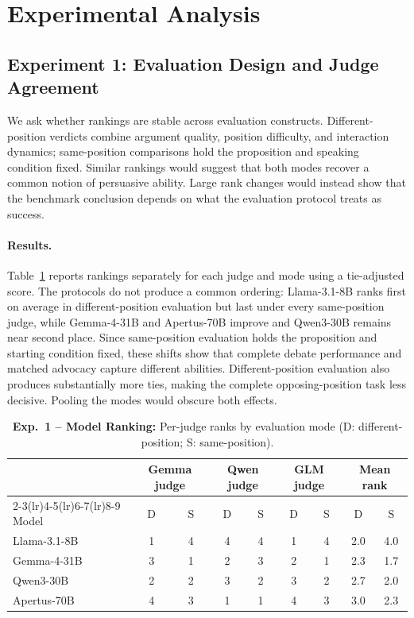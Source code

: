 \documentclass{article}
\begin{document}
\section{Experimental Analysis}

\subsection{Experiment 1: Evaluation Design and Judge Agreement}

We ask whether rankings are stable across evaluation constructs. Different-position verdicts combine argument quality, position difficulty, and interaction dynamics; same-position comparisons hold the proposition and speaking condition fixed. Similar rankings would suggest that both modes recover a common notion of persuasive ability. Large rank changes would instead show that the benchmark conclusion depends on what the evaluation protocol treats as success.

\paragraph{Results.}
Table~\ref{tab:current-mode-ranks} reports rankings separately for each judge and mode using a tie-adjusted score. The protocols do not produce a common ordering: Llama-3.1-8B ranks first on average in different-position evaluation but last under every same-position judge, while Gemma-4-31B and Apertus-70B improve and Qwen3-30B remains near second place. Since same-position evaluation holds the proposition and starting condition fixed, these shifts show that complete debate performance and matched advocacy capture different abilities. Different-position evaluation also produces substantially more ties, making the complete opposing-position task less decisive. Pooling the modes would obscure both effects.

\begin{table}[!t]
  \centering
  \caption{\textbf{Exp.~1 -- Model Ranking:} Per-judge ranks by evaluation mode (D: different-position; S: same-position).}
  \label{tab:current-mode-ranks}
  \begin{tabular}{p{7em}cccccccc}
    \toprule
    & \multicolumn{2}{c}{Gemma judge} & \multicolumn{2}{c}{Qwen judge}
    & \multicolumn{2}{c}{GLM judge} & \multicolumn{2}{c}{Mean rank} \\
    \cmidrule(lr){2-3}\cmidrule(lr){4-5}\cmidrule(lr){6-7}\cmidrule(lr){8-9}
    Model & D & S & D & S & D & S & D & S \\
    \midrule
    Llama-3.1-8B & 1 & 4 & 4 & 4 & 1 & 4 & 2.0 & 4.0 \\
    Gemma-4-31B & 3 & 1 & 2 & 3 & 2 & 1 & 2.3 & 1.7 \\
    Qwen3-30B & 2 & 2 & 3 & 2 & 3 & 2 & 2.7 & 2.0 \\
    Apertus-70B & 4 & 3 & 1 & 1 & 4 & 3 & 3.0 & 2.3 \\
    \bottomrule
  \end{tabular}
\end{table}
\end{document}
